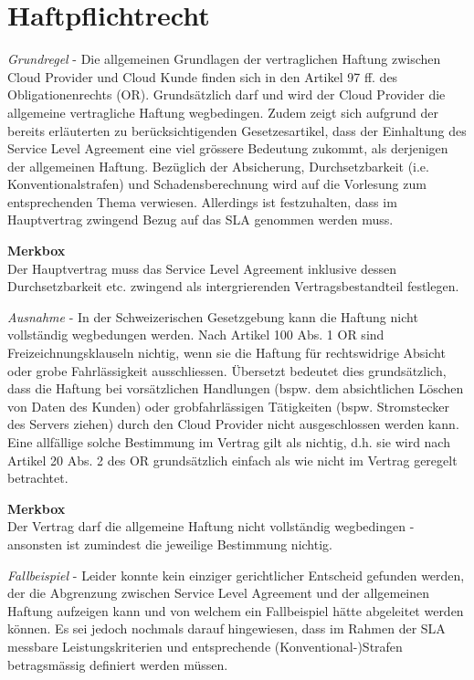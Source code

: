 \documentclass[a4paper,pointlessnumbers]{scrreprt}
\newcommand{\merkbox}[2][0.8\textwidth]{ \begin{center} \begin{tcolorbox}[enhanced, drop fuzzy midday shadow, width={#1}, opacityframe=0.5, colframe=BrickRed, colback=white] {\ECFTeenSpirit \color{BrickRed}\textbf{Merkbox} \qquad {\tiny das gilt es zu beachten}} \\  #2 \end{tcolorbox} \end{center}}
\begin{document}
\section{Haftpflichtrecht}
\textit{Grundregel} - Die allgemeinen Grundlagen der vertraglichen Haftung zwischen Cloud Provider und Cloud Kunde finden sich in den Artikel 97 ff. des Obligationenrechts (OR). Grundsätzlich darf und wird der Cloud Provider die allgemeine vertragliche Haftung wegbedingen. Zudem zeigt sich aufgrund der bereits erläuterten zu berücksichtigenden Gesetzesartikel, dass der Einhaltung des Service Level Agreement eine viel grössere Bedeutung zukommt, als derjenigen der allgemeinen Haftung. Bezüglich der Absicherung, Durchsetzbarkeit (i.e. Konventionalstrafen) und Schadensberechnung wird auf die Vorlesung zum entsprechenden Thema verwiesen. Allerdings ist festzuhalten, dass im Hauptvertrag zwingend Bezug auf das SLA genommen werden muss.

\merkbox[0.7\textwidth]{Der Hauptvertrag muss das Service Level Agreement inklusive dessen Durchsetzbarkeit etc. zwingend als intergrierenden Vertragsbestandteil festlegen.}

\textit{Ausnahme} - In der Schweizerischen Gesetzgebung kann die Haftung nicht vollständig wegbedungen werden. Nach Artikel 100 Abs. 1 OR sind Freizeichnungsklauseln nichtig, wenn sie die Haftung für rechtswidrige Absicht oder grobe Fahrlässigkeit ausschliessen. Übersetzt bedeutet dies grundsätzlich, dass die Haftung bei vorsätzlichen Handlungen (bspw. dem absichtlichen Löschen von Daten des Kunden) oder grobfahrlässigen Tätigkeiten (bspw. Stromstecker des Servers ziehen) durch den Cloud Provider nicht ausgeschlossen werden kann. Eine allfällige solche Bestimmung im Vertrag gilt als nichtig, d.h. sie wird nach Artikel 20 Abs. 2 des OR grundsätzlich einfach als \glqq wie nicht im Vertrag geregelt\grqq{} betrachtet.

\merkbox[0.7\textwidth]{Der Vertrag darf die allgemeine Haftung nicht vollständig wegbedingen - ansonsten ist zumindest die jeweilige Bestimmung nichtig.}

\textit{Fallbeispiel} - Leider konnte kein einziger gerichtlicher Entscheid gefunden werden, der die Abgrenzung zwischen Service Level Agreement und der allgemeinen Haftung aufzeigen kann und von welchem ein Fallbeispiel hätte abgeleitet werden können. Es sei jedoch nochmals darauf hingewiesen, dass im Rahmen der SLA messbare Leistungskriterien und entsprechende (Konventional-)Strafen betragsmässig definiert werden müssen.
\end{document}
